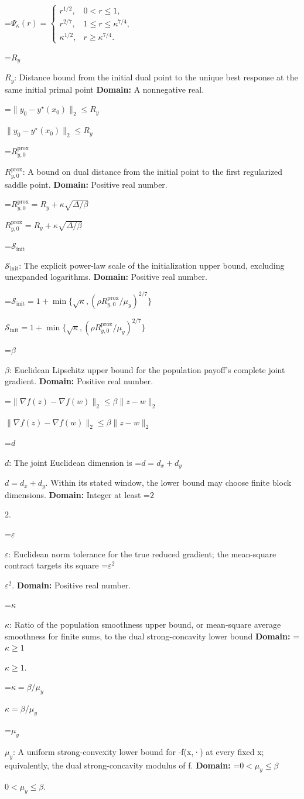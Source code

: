 \documentclass[10pt,a4paper]{article}
\newcommand{\AtlasMath}[1]{\par\begingroup\centering\setbox0=\hbox{$\displaystyle #1$}\ifdim\wd0>1.4\linewidth\typeout{ATLAS WIDE FORMULA: \the\wd0}\fi\ifdim\wd0>\linewidth\resizebox{\linewidth}{!}{\box0}\else\box0\fi\par\endgroup}
\newcommand{\AtlasInlineMath}[1]{\begingroup\setbox0=\hbox{$#1$}\ifdim\wd0>.4\linewidth\endgroup\AtlasMath{#1}\else\endgroup$#1$\fi}
\begin{document}
\AtlasMath{\Psi_\kappa(r)=\begin{cases}r^{1/2},&0<r\le1,\\ r^{2/7},&1\le r\le\kappa^{7/4},\\ \kappa^{1/2},&r\ge\kappa^{7/4}.\end{cases}}


\AtlasInlineMath{R_y}: Distance bound from the initial dual point to the unique best response at the same initial primal point \textbf{Domain:} A nonnegative real.

\AtlasInlineMath{\|y_0-y^\star(x_0)\|_2\le R_y}

\AtlasInlineMath{R_{y,0}^{\mathrm{prox}}}: A bound on dual distance from the initial point to the first regularized saddle point. \textbf{Domain:} Positive real number.

\AtlasInlineMath{R_{y,0}^{\mathrm{prox}}=R_y+\kappa\sqrt{\Delta/\beta}}

\AtlasInlineMath{\mathcal S_{\mathrm{init}}}: The explicit power-law scale of the initialization upper bound, excluding unexpanded logarithms. \textbf{Domain:} Positive real number.

\AtlasInlineMath{\mathcal S_{\mathrm{init}}=1+\min\{\sqrt\kappa,(\rho R_{y,0}^{\mathrm{prox}}/\mu_y)^{2/7}\}}

\AtlasInlineMath{\beta}: Euclidean Lipschitz upper bound for the population payoff's complete joint gradient. \textbf{Domain:} Positive real number.

\AtlasInlineMath{\|\nabla f(z)-\nabla f(w)\|_2\le\beta\|z-w\|_2}

\AtlasInlineMath{d}: The joint Euclidean dimension is \AtlasInlineMath{d=d_x+d_y}. Within its stated window, the lower bound may choose finite block dimensions. \textbf{Domain:} Integer at least \AtlasInlineMath{2}.

\AtlasInlineMath{\varepsilon}: Euclidean norm tolerance for the true reduced gradient; the mean-square contract targets its square \AtlasInlineMath{\varepsilon^2}. \textbf{Domain:} Positive real number.

\AtlasInlineMath{\kappa}: Ratio of the population smoothness upper bound, or mean-square average smoothness for finite sums, to the dual strong-concavity lower bound \textbf{Domain:} \AtlasInlineMath{\kappa\ge1}.

\AtlasInlineMath{\kappa=\beta/\mu_y}

\AtlasInlineMath{\mu_y}: A uniform strong-convexity lower bound for -f(x,·) at every fixed x; equivalently, the dual strong-concavity modulus of f. \textbf{Domain:} \AtlasInlineMath{0<\mu_y\le\beta}.
\end{document}
